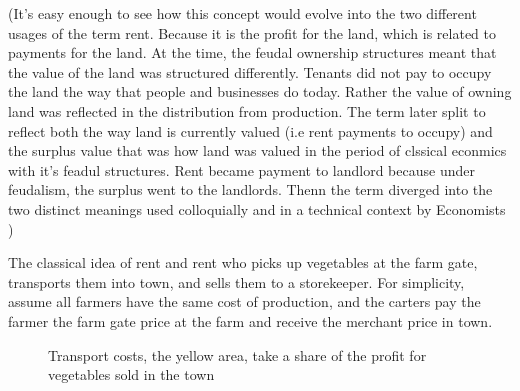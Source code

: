 (It's easy enough to see how this concept would evolve into the two different usages of the term rent. Because it is the profit for the land, which is related to payments for the land. At the time, the feudal ownership structures meant that the value of the land was structured differently. Tenants did not pay to occupy the land the way that people and businesses do today. Rather the value of owning land was reflected in the distribution from production. The term later split to reflect both the way land is currently valued (i.e rent payments to occupy) and the surplus value that was how land was valued in the period of clssical econmics with it's feadul structures. Rent became payment to landlord because under feudalism, the surplus went to the landlords. Thenn the term diverged into the two distinct meanings used colloquially and in a technical context by Economists ) 

The classical idea of rent and rent %
who picks up vegetables at the farm gate, transports them into town, and sells them to a storekeeper. %
For simplicity, assume all farmers have the same cost of production, and the carters pay the farmer the farm gate price at the farm and receive the merchant price in town. 

\begin{figure}
    \begin{center}
    
    \caption{Transport costs, the yellow area, take a share of the profit for vegetables sold in the town}
    \label{fig-rent-ricardo}
    \end{center}
\end{figure}

